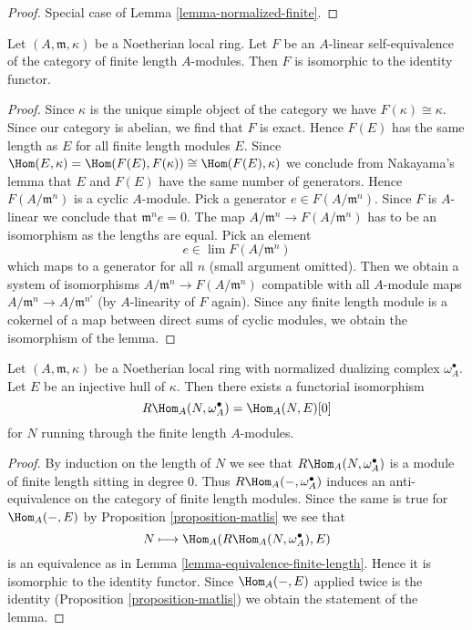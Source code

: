 \begin{proof}
Special case of Lemma \ref{lemma-normalized-finite}.
\end{proof}

\begin{lemma}
\label{lemma-equivalence-finite-length}
Let $(A, \mathfrak m, \kappa)$ be a Noetherian local
ring. Let $F$ be an $A$-linear self-equivalence of the category of
finite length $A$-modules. Then $F$ is isomorphic to the identity functor.
\end{lemma}

\begin{proof}
Since $\kappa$ is the unique simple object of the category we have
$F(\kappa) \cong \kappa$. Since our category is abelian, we find that
$F$ is exact. Hence $F(E)$ has the same length as $E$ for all finite
length modules $E$.
Since $\Hom(E, \kappa) = \Hom(F(E), F(\kappa)) \cong \Hom(F(E), \kappa)$
we conclude from Nakayama's lemma that $E$ and $F(E)$ have the same
number of generators. Hence $F(A/\mathfrak m^n)$ is a cyclic $A$-module.
Pick a generator $e \in F(A/\mathfrak m^n)$.
Since $F$ is $A$-linear we conclude that $\mathfrak m^n e = 0$.
The map $A/\mathfrak m^n \to F(A/\mathfrak m^n)$ has to be
an isomorphism as the lengths are equal. Pick an element
$$
e \in \lim F(A/\mathfrak m^n)
$$
which maps to a generator for all $n$ (small argument omitted).
Then we obtain a system of isomorphisms
$A/\mathfrak m^n \to F(A/\mathfrak m^n)$ compatible with all
$A$-module maps $A/\mathfrak m^n \to A/\mathfrak m^{n'}$ (by $A$-linearity
of $F$ again). Since any finite length module is a cokernel
of a map between direct sums of cyclic modules, we obtain the isomorphism
of the lemma.
\end{proof}

\begin{lemma}
\label{lemma-dualizing-finite-length}
Let $(A, \mathfrak m, \kappa)$ be a Noetherian local
ring with normalized dualizing complex $\omega_A^\bullet$.
Let $E$ be an injective hull of $\kappa$. Then there exists
a functorial isomorphism
$$
R\Hom_A(N, \omega_A^\bullet) = \Hom_A(N, E)[0]
$$
for $N$ running through the finite length $A$-modules.
\end{lemma}

\begin{proof}
By induction on the length of $N$ we see that $R\Hom_A(N, \omega_A^\bullet)$
is a module of finite length sitting in degree $0$. Thus
$R\Hom_A(-, \omega_A^\bullet)$ induces an anti-equivalence
on the category of finite length modules. Since the same is true
for $\Hom_A(-, E)$ by Proposition \ref{proposition-matlis} we see that
$$
N \longmapsto \Hom_A(R\Hom_A(N, \omega_A^\bullet), E)
$$
is an equivalence as in Lemma \ref{lemma-equivalence-finite-length}.
Hence it is isomorphic to the identity functor.
Since $\Hom_A(-, E)$ applied twice is the identity
(Proposition \ref{proposition-matlis}) we obtain
the statement of the lemma.
\end{proof}

